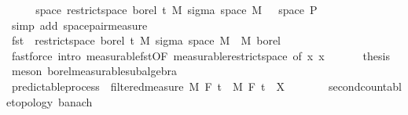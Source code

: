 \begin{isabellebody}
\ \ \isamarkupfalse%
\ \isamarkupfalse%
\ {\isachardoublequoteopen}space\ {\isacharparenleft}{\kern0pt}restrict{\isacharunderscore}{\kern0pt}space\ borel\ {\isacharbraceleft}{\kern0pt}t\ {\isasymOtimes}\isactrlsub M\ sigma\ {\isacharparenleft}{\kern0pt}space\ M{\isacharparenright}{\kern0pt}\ {\isacharbraceleft}{\kern0pt}{\isacharbraceright}{\kern0pt}{\isacharparenright}{\kern0pt}\ {\isacharequal}{\kern0pt}\ space\ {\isasymSigma}\isactrlsub P{\isachardoublequoteclose}\ \isamarkupfalse%
\ {\isacharparenleft}{\kern0pt}simp\ add{\isacharcolon}{\kern0pt}\ space{\isacharunderscore}{\kern0pt}pair{\isacharunderscore}{\kern0pt}measure{\isacharparenright}{\kern0pt}\isanewline
\ \ \isamarkupfalse%
\ \isamarkupfalse%
\ {\isachardoublequoteopen}fst\ {\isasymin}\ restrict{\isacharunderscore}{\kern0pt}space\ borel\ {\isacharbraceleft}{\kern0pt}t\ {\isasymOtimes}\isactrlsub M\ sigma\ {\isacharparenleft}{\kern0pt}space\ M{\isacharparenright}{\kern0pt}\ {\isacharbraceleft}{\kern0pt}{\isacharbraceright}{\kern0pt}\ {\isasymrightarrow}\isactrlsub M\ borel{\isachardoublequoteclose}\ \isamarkupfalse%
\ {\isacharparenleft}{\kern0pt}fastforce\ intro{\isacharcolon}{\kern0pt}\ measurable{\isacharunderscore}{\kern0pt}fst{\isacharprime}{\kern0pt}{\isacharprime}{\kern0pt}{\isacharbrackleft}{\kern0pt}OF\ measurable{\isacharunderscore}{\kern0pt}restrict{\isacharunderscore}{\kern0pt}space{}{\isacharcomma}{\kern0pt}\ of\ {\isachardoublequoteopen}{\isasymlambda}x{\isachardot}{\kern0pt}\ x{\isachardoublequoteclose}{\isacharbrackright}{\kern0pt}{\isacharparenright}{\kern0pt}\ \isanewline
\ \ \isamarkupfalse%
\ \isamarkupfalse%
\ {\isacharquery}{\kern0pt}thesis\ \isamarkupfalse%
\ {\isacharparenleft}{\kern0pt}meson\ borel{\isacharunderscore}{\kern0pt}measurable{\isacharunderscore}{\kern0pt}subalgebra{\isacharparenright}{\kern0pt}\isanewline
{}\isamarkupfalse%
%
\endisatagproof
{\isafoldproof}%
%
\isadelimproof
\isanewline
%
\endisadelimproof
\isanewline
{}\isamarkupfalse%
\isanewline
\isanewline
{}\isamarkupfalse%
\ predictable{\isacharunderscore}{\kern0pt}process\ {\isacharequal}{\kern0pt}\ filtered{\isacharunderscore}{\kern0pt}measure\ M\ F\ t\ \ M\ F\ t\ \ X\ {\isacharcolon}{\kern0pt}{\isacharcolon}{\kern0pt}\ {\isachardoublequoteopen}{\isacharunderscore}{\kern0pt}\ {\isasymRightarrow}\ {\isacharunderscore}{\kern0pt}\ {\isasymRightarrow}\ {\isacharunderscore}{\kern0pt}\ {\isacharcolon}{\kern0pt}{\isacharcolon}{\kern0pt}\ {\isacharbraceleft}{\kern0pt}second{\isacharunderscore}{\kern0pt}countable{\isacharunderscore}{\kern0pt}topology{\isacharcomma}{\kern0pt}\ banach{\isacharbraceright}{\kern0pt}{\isachardoublequoteclose}\ {\isacharplus}{\kern0pt}\isanewline

\end{isabellebody}

